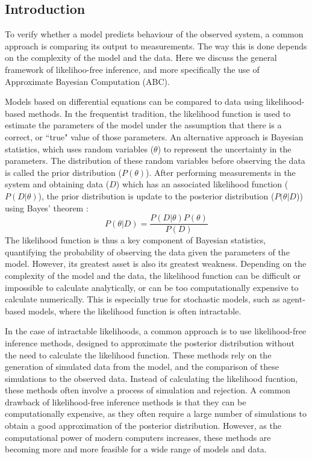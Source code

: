 \subsection{Introduction}
To verify whether a model predicts behaviour of the observed system, a common approach is comparing its
output to measurements. The way this is done depends on the complexity of the model and the data. Here
we discuss the general framework of likelihoo-free inference, and more specifically the use of Approximate
Bayesian Computation (ABC). \par
Models based on differential equations can be compared to data using likelihood-based methods. In the
frequentist tradition, the likelihood function is used to estimate the parameters of the model under the
assumption that there is a correct, or ``true" value of those parameters. An alternative approach is
Bayesian statistics, which uses random variables ($\theta$) to represent the uncertainty in the parameters. The
distribution of these random variables before observing the data is called the prior distribution ($P(\theta)$).
After performing measurements in the system and obtaining data ($D$) which has an associated likelihood function
($P(D|\theta)$), the prior distribution is update to the posterior distribution ($P(\theta|D$)) using Bayes' theorem
\cite{bayes_essay_1763}:
\begin{equation}
    P(\theta|D) = \frac{P(D|\theta)P(\theta)}{P(D)}
\end{equation}
The likelihood function is thus a key component of Bayesian statistics, quantifying the probability of observing
the data given the parameters of the model. However, its greatest asset is also its greatest weakness. Depending
on the complexity of the model and the data, the likelihood function can be difficult or impossible to calculate
analytically, or can be too computationally expensive to calculate numerically. This is especially true for
stochastic models, such as agent-based models, where the likelihood function is often intractable. \par
In the case of intractable likelihoods, a common approach is to use likelihood-free inference methods, designed
to approximate the posterior distribution without the need to calculate the likelihood function. These methods
rely on the generation of simulated data from the model, and the comparison of these simulations to the observed
data. Instead of calculating the likelihood fucntion, these methods often involve a process of simulation and
rejection. A common drawback of likelihood-free inference methods is that they can be computationally expensive,
as they often require a large number of simulations to obtain a good approximation of the posterior distribution.
However, as the computational power of modern computers increases, these methods are becoming more and more
feasible for a wide range of models and data.

